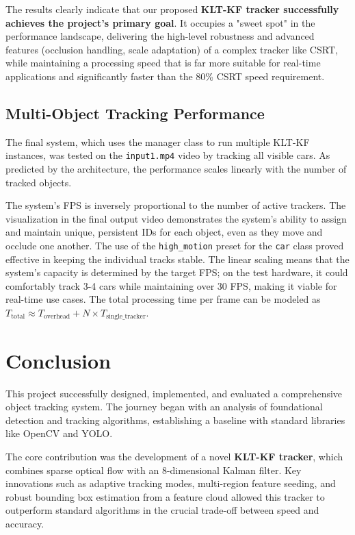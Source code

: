 \documentclass[12pt, a4paper]{article}
\begin{document}
The results clearly indicate that our proposed \textbf{KLT-KF tracker successfully achieves the project's primary goal}. It occupies a "sweet spot" in the performance landscape, delivering the high-level robustness and advanced features (occlusion handling, scale adaptation) of a complex tracker like CSRT, while maintaining a processing speed that is far more suitable for real-time applications and significantly faster than the 80\% CSRT speed requirement.

\subsection{Multi-Object Tracking Performance}
The final system, which uses the manager class to run multiple KLT-KF instances, was tested on the \texttt{input1.mp4} video by tracking all visible cars. As predicted by the architecture, the performance scales linearly with the number of tracked objects.

The system's FPS is inversely proportional to the number of active trackers. The visualization in the final output video demonstrates the system's ability to assign and maintain unique, persistent IDs for each object, even as they move and occlude one another. The use of the \lstinline!high_motion! preset for the \lstinline!car! class proved effective in keeping the individual tracks stable. The linear scaling means that the system's capacity is determined by the target FPS; on the test hardware, it could comfortably track 3-4 cars while maintaining over 30 FPS, making it viable for real-time use cases. The total processing time per frame can be modeled as $T_{\text{total}} \approx T_{\text{overhead}} + N \times T_{\text{single\_tracker}}$.

\section{Conclusion}
This project successfully designed, implemented, and evaluated a comprehensive object tracking system. The journey began with an analysis of foundational detection and tracking algorithms, establishing a baseline with standard libraries like OpenCV and YOLO.

The core contribution was the development of a novel \textbf{KLT-KF tracker}, which combines sparse optical flow with an 8-dimensional Kalman filter. Key innovations such as adaptive tracking modes, multi-region feature seeding, and robust bounding box estimation from a feature cloud allowed this tracker to outperform standard algorithms in the crucial trade-off between speed and accuracy.
\end{document}
